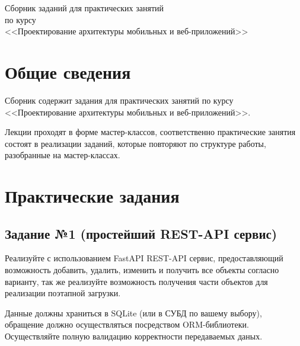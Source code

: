 \documentclass{article}
\begin{document}
{
    \thispagestyle{empty}
    \vspace*{\fill}
    \centering

    \Large Сборник заданий для практических занятий \\
    по курсу \\
    <<Проектирование архитектуры мобильных и веб-приложений>> \\
    \large
    \vspace{40pt}
    \vspace*{\fill}
    \newpage
}

\tableofcontents
\newpage

\section{Общие сведения}

Сборник содержит задания для практических занятий по курсу <<Проектирование архитектуры мобильных и веб-приложений>>.

Лекции проходят в форме мастер-классов, соответственно практические занятия состоят в реализации
заданий, которые повторяют по структуре работы, разобранные на мастер-классах.


\section{Практические задания}
\subsection{Задание №1 (простейший REST-API сервис)}

Реализуйте с использованием FastAPI REST-API сервис, предоставляющий возможность добавить,
удалить, изменить и получить все объекты согласно варианту, так же реализуйте возможность 
получения части объектов для реализации поэтапной загрузки.

Данные должны храниться в SQLite (или в СУБД по вашему выбору), 
обращение должно осуществляться
посредством ORM-библиотеки. Осуществляйте полную валидацию корректности передаваемых даных.
\end{document}
